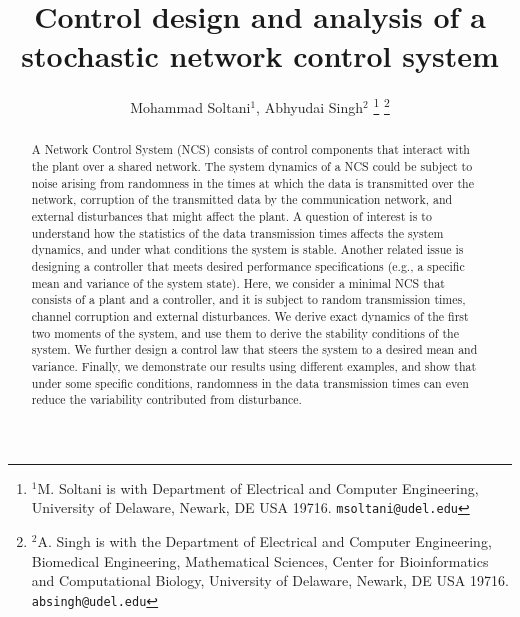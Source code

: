 \documentclass[letterpaper, 10 pt,one column, conference]{ieeeconf}  %
\title{\LARGE \bf
Control design and analysis of a stochastic network control system 
}
\author{Mohammad Soltani$^{1}$, Abhyudai Singh$^{2}$%
\thanks{$^{1}$M. Soltani is with Department of Electrical and Computer Engineering, University of Delaware, Newark, DE USA 19716.
{\tt\small msoltani@udel.edu}}%
\thanks{$^{2}$A. Singh is with the Department of Electrical and Computer Engineering, Biomedical Engineering, Mathematical Sciences, Center for Bioinformatics and Computational Biology, University of Delaware, Newark, DE USA 19716.
{\tt\small absingh@udel.edu}}}
\begin{document}
\maketitle
\thispagestyle{empty}
\pagestyle{empty}

\begin{abstract}

A Network Control System (NCS) consists of control components that interact with the plant over a shared network. The system dynamics of a NCS could be subject to noise arising from randomness in the times at which the data is transmitted over the network, corruption of the transmitted data by the communication network, and external disturbances that might affect the plant. A question of interest is to understand how the statistics of the data transmission times affects the system dynamics, and under what conditions the system is stable. Another related issue is designing a controller that meets desired performance specifications (e.g., a specific mean and variance of the system state). Here, we consider a minimal NCS that consists of a plant and a controller, and it is subject to random transmission times, channel corruption and external disturbances.  We derive exact dynamics of the first two moments of the system, and use them to derive the stability conditions of the system. We further design a control law that steers the system to a desired mean and variance. Finally, we demonstrate our results using different examples, and show that under some specific conditions, randomness in the data transmission times can even reduce the variability contributed from disturbance.

\end{abstract}
\end{document}
